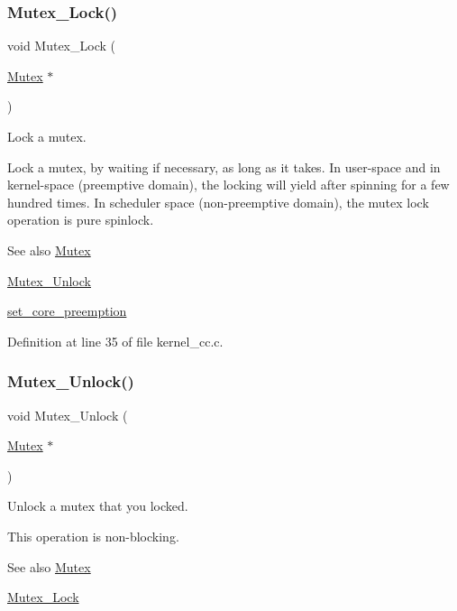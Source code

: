 \subsubsection{\texorpdfstring{Mutex\+\_\+\+Lock()}{Mutex\_Lock()}}
{\footnotesize\ttfamily void Mutex\+\_\+\+Lock (\begin{DoxyParamCaption}\item[{\hyperlink{group__syscalls_gaef2ec62cae8e0031fd19fc8b91083ade}{Mutex} $\ast$}]{ }\end{DoxyParamCaption})}



Lock a mutex. 

Lock a mutex, by waiting if necessary, as long as it takes. In user-\/space and in kernel-\/space (preemptive domain), the locking will yield after spinning for a few hundred times. In scheduler space (non-\/preemptive domain), the mutex lock operation is pure spinlock.

\begin{DoxySeeAlso}{See also}
\hyperlink{group__syscalls_gaef2ec62cae8e0031fd19fc8b91083ade}{Mutex} 

\hyperlink{group__syscalls_ga0b98d0315d0931d0c28104c36dd559c9}{Mutex\+\_\+\+Unlock} 

\hyperlink{kernel__cc_8h_a6121802a0b64aae83288f60bf8a76834}{set\+\_\+core\+\_\+preemption} 
\end{DoxySeeAlso}


Definition at line 35 of file kernel\+\_\+cc.\+c.

\mbox{\label{group__syscalls_ga0b98d0315d0931d0c28104c36dd559c9}} 
\subsubsection{\texorpdfstring{Mutex\+\_\+\+Unlock()}{Mutex\_Unlock()}}
{\footnotesize\ttfamily void Mutex\+\_\+\+Unlock (\begin{DoxyParamCaption}\item[{\hyperlink{group__syscalls_gaef2ec62cae8e0031fd19fc8b91083ade}{Mutex} $\ast$}]{ }\end{DoxyParamCaption})}



Unlock a mutex that you locked. 

This operation is non-\/blocking. \begin{DoxySeeAlso}{See also}
\hyperlink{group__syscalls_gaef2ec62cae8e0031fd19fc8b91083ade}{Mutex} 

\hyperlink{group__syscalls_ga1140be44df71d39edaf6a7262fb763ca}{Mutex\+\_\+\+Lock} 
\end{DoxySeeAlso}


